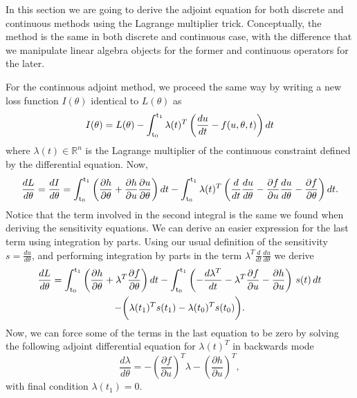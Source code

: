 \label{appendix:lagrangian}

In this section we are going to derive the adjoint equation for both discrete and continuous methods using the Lagrange multiplier trick. 
Conceptually, the method is the same in both discrete and continuous case, with the difference that we manipulate linear algebra objects for the former and continuous operators for the later. 

For the continuous adjoint method, we proceed the same way by writing a new loss function $I(\theta)$ identical to $L(\theta)$ as 
\begin{equation}
    I(\theta) = L(\theta) - \operatorname{\int_{t_0}^{t_1}} \lambda(t)^T \left( \frac{du}{dt} - f(u, \theta, t) \right) dt
\end{equation}
where $\lambda(t) \in \mathbb R^n$ is the Lagrange multiplier of the continuous constraint defined by the differential equation. Now, 
\begin{equation}
    \frac{dL}{d\theta} = \frac{dI}{d\theta} = 
    \operatorname{\int_{t_0}^{t_1}} \left( \frac{\partial h}{\partial \theta} + \frac{\partial h}{\partial u} \frac{\partial u}{\partial \theta} \right) dt
    - 
    \operatorname{\int_{t_0}^{t_1}} \lambda(t)^T \left( \frac{d}{dt} \frac{du}{d\theta} - \frac{\partial f}{\partial u} \frac{du}{d\theta} - \frac{\partial f}{\partial \theta} \right) dt.
\end{equation}
Notice that the term involved in the second integral is the same we found when deriving the sensitivity equations. 
We can derive an easier expression for the last term using integration by parts. 
Using our usual definition of the sensitivity $s = \frac{du}{d\theta}$, and performing integration by parts in the term $\lambda^T \frac{d}{dt} \frac{du}{d\theta}$ we derive 
\begin{multline}
    \frac{dL}{d\theta}
    = 
    \operatorname{\int_{t_0}^{t_1}} \left( \frac{\partial h}{\partial \theta} + \lambda^T \frac{\partial f}{\partial \theta} \right) dt 
    - 
    \operatorname{\int_{t_0}^{t_1}} \left( - \frac{d\lambda^T}{dt} - \lambda^T \frac{\partial f}{\partial u} - \frac{\partial h}{\partial u} \right) \, s(t) \, dt \\
    -
    \bigg ( \lambda(t_1)^T s(t_1) - \lambda(t_0)^T s(t_0) \bigg ).
    \label{eq:continous-adjoint-loss}
\end{multline}
Now, we can force some of the terms in the last equation to be zero by solving the following adjoint differential equation for $\lambda(t)^T$ in backwards mode
\begin{equation}
    \frac{d\lambda}{d\theta} = - \left(\frac{\partial f}{\partial u}\right)^T \lambda - \left( \frac{\partial h}{\partial u} \right)^T,
    \label{eq:continuous-adjoint}
\end{equation}
with final condition $\lambda(t_1) = 0$. 